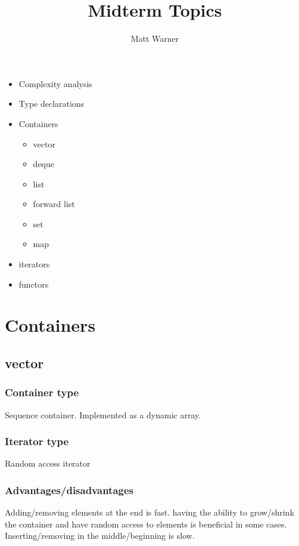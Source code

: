 \documentclass{report}
\title{\Huge{Midterm Topics}}
\author{\huge{Matt Warner}}
\date{\huge{}}
\begin{document}
    \maketitle
    \begin{itemize}
        \item Complexity analysis
        \item Type declarations
        \item Containers
            \begin{itemize}[label=$\circ$]
                \item vector
                \item deque
                \item list
                \item forward list
                \item set
                \item map
            \end{itemize}
        \item iterators
        \item functors
    \end{itemize}
    \section{Containers}
    \subsection{vector}
    \subsubsection{Container type}
    Sequence container.
    \bigbreak \noindent
    Implemented as a dynamic array.
    \subsubsection{Iterator type}
    Random access iterator
    \subsubsection{Advantages/disadvantages}
    Adding/removing elements at the end is fast. having the ability to  grow/shrink the container and have random access to elements is beneficial in some cases.
    \bigbreak \noindent
    Inserting/removing in the middle/beginning is slow.
\end{document}
